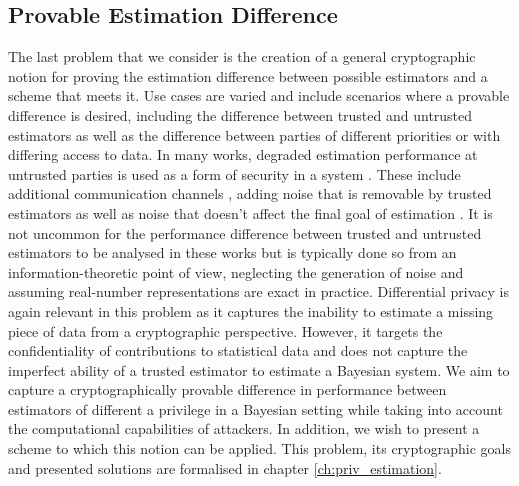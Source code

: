 % 
% 

\subsection{Provable Estimation Difference}\label{subsec:intro:provable_est_perf}
The last problem that we consider is the creation of a general cryptographic notion for proving the estimation difference between possible estimators and a scheme that meets it. Use cases are varied and include scenarios where a provable difference is desired, including the difference between trusted and untrusted estimators as well as the difference between parties of different priorities or with differing access to data. In many works, degraded estimation performance at untrusted parties is used as a form of security in a system \cite{specialePrivacyPreservingImageBased2019,liPrivacyPreservingDistributedOptimization2020,leongTransmissionSchedulingRemote2019,leongInformationBoundsState2019,grovesPrinciplesGNSSInertial2015}. These include additional communication channels \cite{leongInformationBoundsState2019,grovesPrinciplesGNSSInertial2015}, adding noise that is removable by trusted estimators \cite{murguiaInformationTheoreticPrivacyChaos2020,leongUseArtificialNoise2018} as well as noise that doesn't affect the final goal of estimation \cite{liPrivacyPreservingDistributedOptimization2020}. It is not uncommon for the performance difference between trusted and untrusted estimators to be analysed in these works \cite{hePreservingDataPrivacyAdded2018,murguiaInformationTheoreticPrivacyChaos2020,sinopoliKalmanFilteringIntermittent2004,mishraSecureStateEstimation2015} but is typically done so from an information-theoretic point of view, neglecting the generation of noise and assuming real-number representations are exact in practice. Differential privacy \cite{dworkDifferentialPrivacySurvey2008} is again relevant in this problem as it captures the inability to estimate a missing piece of data from a cryptographic perspective. However, it targets the confidentiality of contributions to statistical data and does not capture the imperfect ability of a trusted estimator to estimate a Bayesian system. We aim to capture a cryptographically provable difference in performance between estimators of different a privilege in a Bayesian setting while taking into account the computational capabilities of attackers. In addition, we wish to present a scheme to which this notion can be applied. This problem, its cryptographic goals and presented solutions are formalised in chapter \ref{ch:priv_estimation}.

